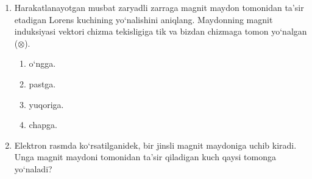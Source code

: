 \begin{enumerate}
\begin{enumerate}[label=\Alph*)]
\item 1.
\item 3.
\item 4.
\item 2.
\end{enumerate}

\item Harakatlanayotgan musbat zaryadli zarraga magnit maydon tomonidan ta’sir etadigan Lorens kuchining yo‘nalishini aniqlang. Maydonning magnit induksiyasi vektori chizma tekisligiga tik va bizdan chizmaga tomon yo‘nalgan ($\otimes$).


\begin{enumerate}[label=\Alph*)]
\item o‘ngga.
\item pastga.
\item yuqoriga.
\item chapga.
\end{enumerate}

\item Elektron rasmda ko‘rsatilganidek, bir jinsli magnit maydoniga uchib kiradi. Unga magnit maydoni tomonidan ta’sir qiladigan kuch qaysi tomonga yo‘naladi?

\end{enumerate}
